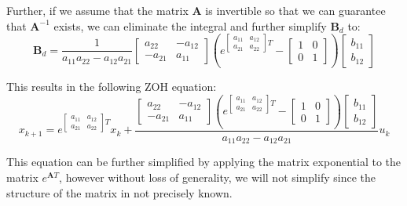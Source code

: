 \documentclass{article}
\begin{document}
Further, if we assume that the matrix $\bm{A}$ is invertible so that we can guarantee that $\bm{A}^{-1}$ exists, we can eliminate the integral and further simplify $\bm{B}_d$ to:
\begin{equation}
    \bm{B}_d=\frac{1}{a_{11}a_{22}-a_{12}a_{21}}
    \begin{bmatrix}
        a_{22} & -a_{12} \\
        -a_{21} & a_{11}
    \end{bmatrix}
    (e^{
    \begin{bmatrix}
    a_{11} & a_{12} \\
    a_{21} & a_{22}
    \end{bmatrix}T}-
    \begin{bmatrix}
        1 & 0 \\
        0 & 1
    \end{bmatrix})
    \begin{bmatrix}
         b_{11} \\
        b_{12}
    \end{bmatrix}
\end{equation}

This results in the following ZOH equation:
\begin{equation}
    x_{k+1}=e^{
    \begin{bmatrix}
    a_{11} & a_{12} \\
    a_{21} & a_{22}
    \end{bmatrix}T}x_k+\frac{
    \begin{bmatrix}
        a_{22} & -a_{12} \\
        -a_{21} & a_{11}
    \end{bmatrix}
    (e^{
    \begin{bmatrix}
    a_{11} & a_{12} \\
    a_{21} & a_{22}
    \end{bmatrix}T}-
    \begin{bmatrix}
        1 & 0 \\
        0 & 1
    \end{bmatrix})
    \begin{bmatrix}
         b_{11} \\
        b_{12}
    \end{bmatrix}}{a_{11}a_{22}-a_{12}a_{21}}u_k
\end{equation}

This equation can be further simplified by applying the matrix exponential to the matrix $e^{\bm{A}T}$, however without loss of generality, we will not simplify since the structure of the matrix in not precisely known. 
\end{document}

